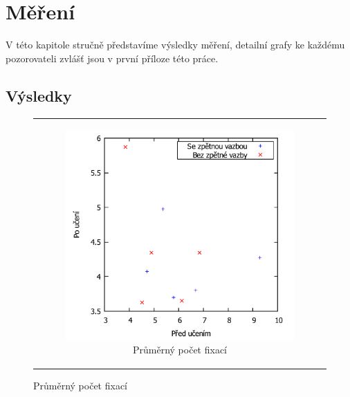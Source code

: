 \chapter{Měření}

V této kapitole stručně představíme výsledky měření, detailní grafy ke každému pozorovateli zvlášť jsou v první příloze této práce.

\section{Výsledky}
\begin{figure}[h!]
\centering
\begin{tabular}{c}
\begin{subfigure}{0.80\textwidth}
\includegraphics[width=0.99\linewidth]{graphs/AverageTries}
\caption{Průměrný počet fixací}
\end{subfigure}\\
\end{tabular}
\end{figure}
